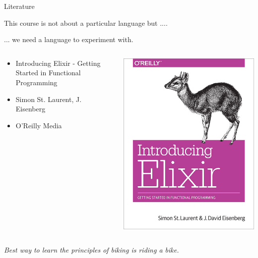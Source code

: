 \begin{frame}{Literature}

  This course is not about a particular language but .... \pause

  \vspace{20pt}\hspace{40pt} ... we need a language to experiment with.

\pause
\begin{columns}
 \begin{column}{0.6\linewidth}
   \begin{itemize}
   \item Introducing Elixir - Getting Started in Functional Programming
   \item Simon St. Laurent, J. Eisenberg
   \item O'Reilly Media
   \end{itemize}
 \end{column}
 \begin{column}{0.4\linewidth}
    \includegraphics[scale=0.2]{lrg.jpg}    
 \end{column}
\end{columns}

  \vspace{20pt}\hspace{40pt} {\em Best way to learn the principles of biking is riding a bike.}

\end{frame}


